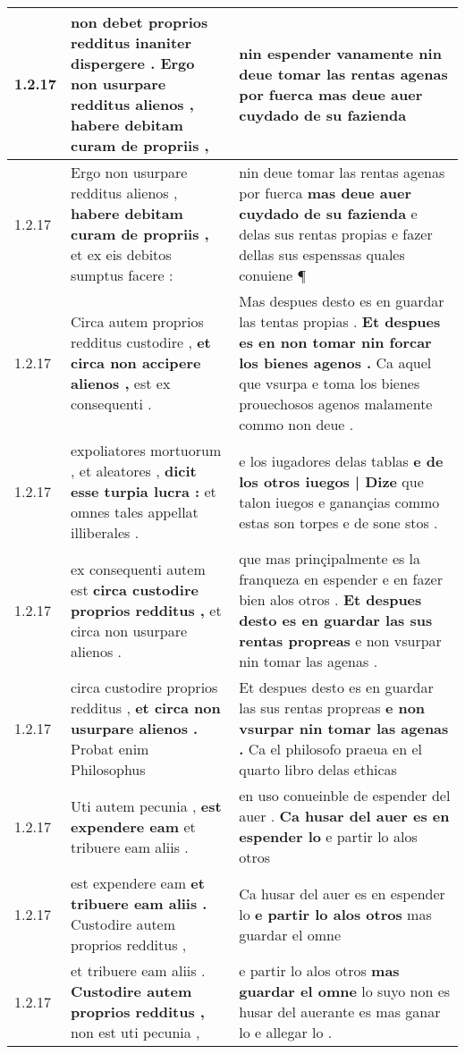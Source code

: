 \begin{tabular}{|p{1cm}|p{6.5cm}|p{6.5cm}|}
1.2.17 & non debet proprios redditus inaniter dispergere . \textbf{ Ergo non usurpare redditus alienos , } habere debitam curam de propriis , & nin espender vanamente \textbf{ nin deue tomar las rentas agenas por fuerca } mas deue auer cuydado de su fazienda \\\hline
1.2.17 & Ergo non usurpare redditus alienos , \textbf{ habere debitam curam de propriis , } et ex eis debitos sumptus facere : & nin deue tomar las rentas agenas por fuerca \textbf{ mas deue auer cuydado de su fazienda } e delas sus rentas propias e fazer dellas sus espenssas quales conuiene ¶ \\\hline
1.2.17 & Circa autem proprios redditus custodire , \textbf{ et circa non accipere alienos , } est ex consequenti . & Mas despues desto es en guardar las tentas propias . \textbf{ Et despues es en non tomar nin forcar los bienes agenos . } Ca aquel que vsurpa e toma los bienes prouechosos agenos malamente commo non deue . \\\hline
1.2.17 & expoliatores mortuorum , et aleatores , \textbf{ dicit esse turpia lucra : } et omnes tales appellat illiberales . & e los iugadores delas tablas \textbf{ e de los otros iuegos | Dize } que talon iuegos e ganançias commo estas son torpes e de sone stos . \\\hline
1.2.17 & ex consequenti autem est \textbf{ circa custodire proprios redditus , } et circa non usurpare alienos . & que mas prinçipalmente es la franqueza en espender e en fazer bien alos otros . \textbf{ Et despues desto es en guardar las sus rentas propreas } e non vsurpar nin tomar las agenas . \\\hline
1.2.17 & circa custodire proprios redditus , \textbf{ et circa non usurpare alienos . } Probat enim Philosophus & Et despues desto es en guardar las sus rentas propreas \textbf{ e non vsurpar nin tomar las agenas . } Ca el philosofo praeua en el quarto libro delas ethicas \\\hline
1.2.17 & Uti autem pecunia , \textbf{ est expendere eam } et tribuere eam aliis . & en uso conueinble de espender del auer . \textbf{ Ca husar del auer es en espender lo } e partir lo alos otros \\\hline
1.2.17 & est expendere eam \textbf{ et tribuere eam aliis . } Custodire autem proprios redditus , & Ca husar del auer es en espender lo \textbf{ e partir lo alos otros } mas guardar el omne \\\hline
1.2.17 & et tribuere eam aliis . \textbf{ Custodire autem proprios redditus , } non est uti pecunia , & e partir lo alos otros \textbf{ mas guardar el omne } lo suyo non es husar del auerante es mas ganar lo e allegar lo . \\\hline

\end{tabular}
